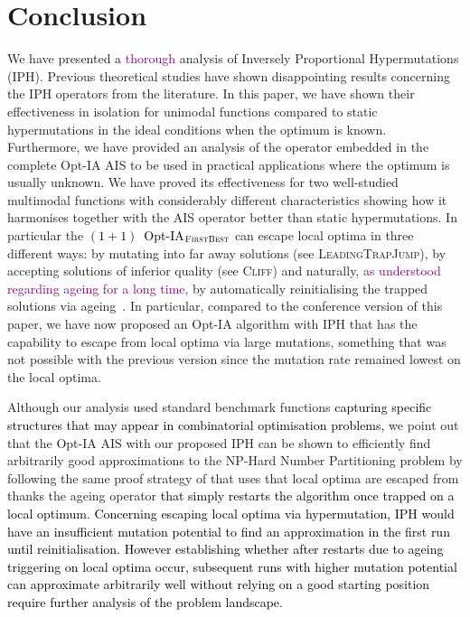 \documentclass[lettersize,journal]{IEEEtran}
\newcommand{\rev}[1]{\textcolor{black}{#1}}
\newcommand{\rerev}[1]{\textcolor{purple}{#1}}
\begin{document}
\section{Conclusion}
We have presented a \rerev{thorough} analysis of Inversely Proportional Hypermutations (IPH).
Previous theoretical studies have shown disappointing results concerning the IPH operators from the literature.
In this paper, we have 
shown their effectiveness in isolation for unimodal functions compared to static hypermutations in the ideal conditions when the optimum is known.
Furthermore, we have provided an analysis of the operator embedded in the complete Opt-IA AIS to be used in practical applications where the optimum is usually unknown.
We have proved its effectiveness for two well-studied multimodal functions with considerably different characteristics showing how it harmonises together with the AIS operator better than static hypermutations.
In particular the \rev{$(1+1)$~Opt-IA$_{\textsc{FirstBest}}$} can escape local optima in three different ways: by mutating into far away solutions (see \textsc{LeadingTrapJump}), by accepting solutions of inferior quality (see \textsc{Cliff}) and naturally, \rerev{as understood regarding ageing for a long time,} by automatically reinitialising the trapped solutions via ageing~\cite{HorobaJansenZarges09,JansenZarges2011differentageing,JansenZarges2010restart,OlivetoSudholt2014ageing}.
In particular, compared to the conference version of this paper, we have now proposed an Opt-IA algorithm with IPH that has the capability to escape from local optima via large mutations, something that was not possible with the previous version since the mutation rate remained lowest on the local optima.


Although our analysis used standard benchmark functions \rev{capturing specific structures that may appear in combinatorial optimisation problems,}
 we point out that the Opt-IA AIS with our proposed IPH can be shown to efficiently find arbitrarily good approximations to the NP-Hard Number Partitioning problem by following the same proof strategy of \cite{CorusOlivetoYazdaniAIJ2019} that uses that local optima are escaped from thanks the ageing operator \rev{that simply restarts the algorithm once trapped on a local optimum.}  \textcolor{black}{Concerning escaping local optima via hypermutation, IPH would have an insufficient mutation potential to find an approximation in the first run until reinitialisation. However \rev{establishing} whether \rev{after restarts due to ageing triggering on local optima occur,} subsequent runs  with higher mutation potential can approximate arbitrarily well without relying on a good starting position require further analysis of the problem landscape.} 
\end{document}
